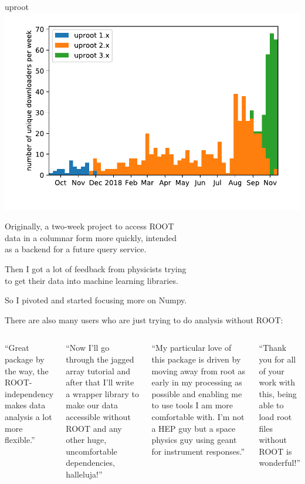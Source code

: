\documentclass[aspectratio=169]{beamer}
\begin{document}
\begin{frame}{uproot}
\vspace{0.25 cm}
\hfill \mbox{\includegraphics[height=4.5 cm]{weeks_byversion.pdf}\hspace{-1 cm}}

\vspace{-4.25 cm}
Originally, a two-week project to access ROOT \\ data in a columnar form more quickly, intended \\ as a backend for a future query service.

\vspace{0.35 cm}
Then I got a lot of feedback from physicists trying \\ to get their data into machine learning libraries.

\vspace{0.35 cm}
So I pivoted and started focusing more on Numpy.

\vspace{0.35 cm}
There are also many users who are just trying to do analysis without ROOT:

\vspace{0.15 cm}
\scriptsize
\begin{columns}
``Great package by the way, the ROOT-independency makes data analysis a lot more flexible.''

\vspace{0.25 cm}
``Now I'll go through the jagged array tutorial and after that I'll write a wrapper library to make our data accessible without ROOT and any other huge, uncomfortable dependencies, halleluja!''


``My particular love of this package is driven by moving away from root as early in my processing as possible and enabling me to use tools I am more comfortable with. I'm not a HEP guy but a space physics guy using geant for instrument responses.''

\vspace{0.25 cm}
``Thank you for all of your work with this, being able to load root files without ROOT is wonderful!''
\end{columns}
\end{frame}
\end{document}
